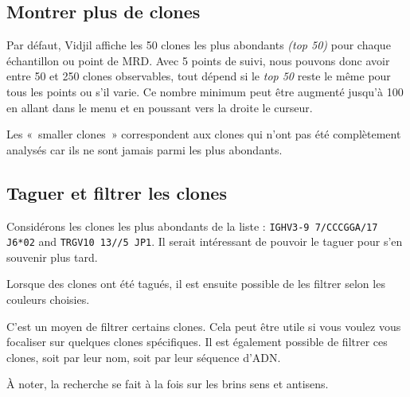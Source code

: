 \documentclass[11pt]{article}
\begin{document}
\subsection{Montrer plus de clones}

Par défaut, Vidjil affiche les 50 clones les plus abondants \textit{(top 50)}
pour chaque échantillon ou point de MRD. Avec 5 points de suivi, nous
pouvons donc avoir entre 50 et 250 clones observables, tout dépend si le
\textit{top 50} reste le même pour tous les points ou s'il varie.
Ce nombre
minimum peut être augmenté jusqu'à 100 en allant dans le menu  et en
poussant vers la droite le curseur.

 Les «~smaller clones~» correspondent aux clones qui n'ont
  pas été complètement analysés car ils ne sont jamais parmi les plus abondants.


\subsection{Taguer et filtrer les clones}

Considérons les clones les plus abondants de la liste :
\texttt{IGHV3-9 7/CCCGGA/17 J6*02} and  \texttt{TRGV10 13//5 JP1}.
Il serait intéressant de pouvoir le taguer pour s'en souvenir plus tard.


Lorsque des clones ont été tagués, il est ensuite possible de
les filtrer selon les couleurs choisies.


C'est un moyen de filtrer certains clones. Cela peut être utile si vous
voulez vous focaliser sur quelques clones spécifiques. Il est également
possible de filtrer ces clones, soit par leur nom, soit par leur séquence
d'ADN.

À noter, la recherche se fait à la fois sur les brins sens
  et antisens.
\end{document}
